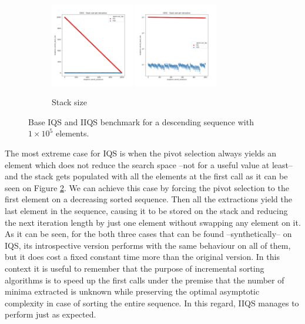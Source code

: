 \begin{figure}
    \begin{subfigure}[b]{\textwidth}
        \centering
        \includegraphics[width=0.40\textwidth]{./fragments/04_experimental_execution/images/01_basebenchmark_03_sort_d_case.png.2_0.png}
        \includegraphics[width=0.40\textwidth]{./fragments/04_experimental_execution/images/01_basebenchmark_03_sort_d_case.png.2_1.png}
        \caption{Stack size}
        \label{FIG:BENCHMARK_03_DESC_CASE__0_0}
    \end{subfigure}
    
    \caption{Base IQS and IIQS benchmark for a descending sequence with $1\times10^5$ elements.}
    \label{FIG:BENCHMARK_03_DESC_CASE}
\end{figure}

The most extreme case for IQS is when the pivot selection always yields an element which does not reduce the search space --not for a useful value at least-- and the stack gets populated with all the elements at the first call as it can be seen on Figure \ref{FIG:BENCHMARK_03_DESC_CASE}. We can achieve this case by forcing the pivot selection to the first element on a decreasing sorted sequence. Then all the extractions yield the last element in the sequence, causing it to be stored on the stack and reducing the next iteration length by just one element without swapping any element on it.\\

As it can be seen, for the both three cases that can be found --synthetically-- on IQS, its introspective version performs with the same behaviour on all of them, but it does cost a fixed constant time more than the original version. In this context it is useful to remember that the purpose of incremental sorting algorithms is to speed up the first calls under the premise that the number of minima extracted is unknown while preserving the optimal asymptotic complexity in case of sorting the entire sequence. In this regard, IIQS manages to perform just as expected.\\

